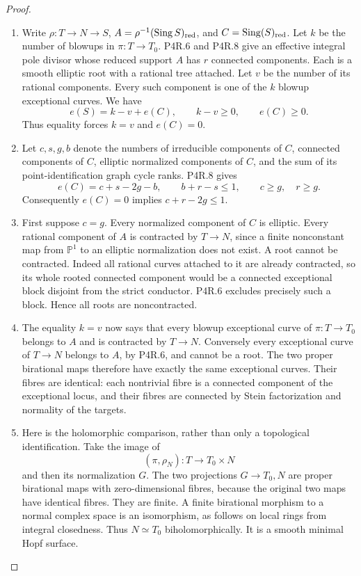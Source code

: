 \begin{proof}

\begin{enumerate}[label={$\langle1\rangle$\arabic*.},leftmargin=*]
\item Write \(\rho:T\to N\to S\), \(A=\rho^{-1}(\operatorname{Sing}S)_{\rm red}\),
and \(C=\operatorname{Sing}(S)_{\rm red}\). Let \(k\) be the number of
blowups in \(\pi:T\to T_0\). P4R.6 and P4R.8 give an effective integral pole
divisor whose reduced support \(A\) has \(r\) connected components. Each is
a smooth elliptic root with a rational tree attached. Let \(v\) be the
number of its rational components. Every such component is one of the
\(k\) blowup exceptional curves. We have
\[
 e(S)=k-v+e(C),\qquad k-v\ge0,\qquad e(C)\ge0.
\]
Thus equality forces \(k=v\) and \(e(C)=0\).

\item Let \(c,s,g,b\) denote the numbers of irreducible components of \(C\),
connected components of \(C\), elliptic normalized components of \(C\), and
the sum of its point-identification graph cycle ranks. P4R.8 gives
\[
 e(C)=c+s-2g-b,\qquad
 b+r-s\le1,\qquad c\ge g,\quad r\ge g.
\]
Consequently \(e(C)=0\) implies \(c+r-2g\le1\).

\item First suppose \(c=g\). Every normalized component of \(C\) is elliptic.
Every rational component of \(A\) is contracted by \(T\to N\), since a
finite nonconstant map from \(\mathbb P^1\) to an elliptic normalization
does not exist. A root cannot be contracted. Indeed all rational curves
attached to it are already contracted, so its whole rooted connected
component would be a connected exceptional block disjoint from the strict
conductor. P4R.6 excludes precisely such a block. Hence all roots are
noncontracted.

\item The equality \(k=v\) now says that every blowup exceptional curve of
\(\pi:T\to T_0\) belongs to \(A\) and is contracted by \(T\to N\).
Conversely every exceptional curve of \(T\to N\) belongs to \(A\), by
P4R.6, and cannot be a root. The two proper birational maps therefore have
exactly the same exceptional curves. Their fibres are identical: each
nontrivial fibre is a connected component of the exceptional locus, and
their fibres are connected by Stein factorization and normality of the
targets.

\item Here is the holomorphic comparison, rather than only a topological
identification. Take the image of
\[
 (\pi,\rho_N):T\longrightarrow T_0\times N
\]
and then its normalization \(G\). The two projections \(G\to T_0,N\)
are proper birational maps with zero-dimensional fibres, because the
original two maps have identical fibres. They are finite. A finite
birational morphism to a normal complex space is an isomorphism, as follows
on local rings from integral closedness. Thus \(N\simeq T_0\)
biholomorphically. It is a smooth minimal Hopf surface.


\end{enumerate}
\end{proof}
